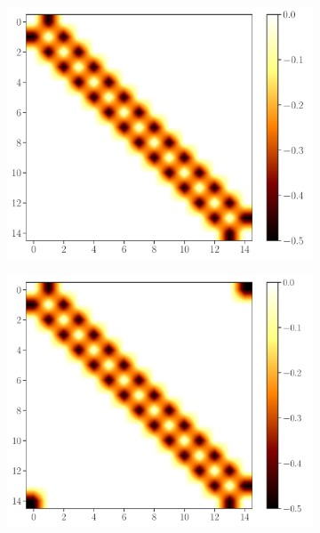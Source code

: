 \documentclass[11pt, a4paper, oneside]{book}
\theoremstyle{definition} %
\begin{document}
	\begin{figure}[h]
\centering
		\begin{subfigure}[b]{0.31\textwidth}
			\includegraphics[width=\textwidth]{ColorMapMatrices_OBC}
			\caption{}
		\end{subfigure}
		\begin{subfigure}[b]{0.31\textwidth}
			\includegraphics[width=\textwidth]{ColorMapMatrices_PBC}
			\caption{}
		\end{subfigure}
		\begin{subfigure}[b]{0.31\textwidth}

\end{subfigure}
\end{figure}
\end{document}
